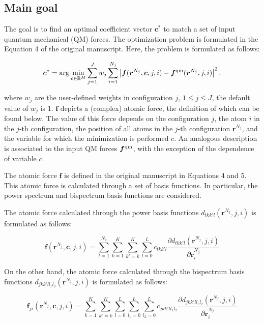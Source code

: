 \documentclass[12pt]{article}
\begin{document}
\subsection{Main goal}

The goal is to find an optimal coefficient vector $\bm c^*$ to match a set of input quantum mechanical (QM) forces. The optimization problem is formulated in the Equation 4 of the original manuscript. Here, the problem is formulated as follows:

\begin{equation}
\bm c^* = \arg \min_{\bm c \in \mathbb{R}^M } \sum_{j=1}^J w_j \sum_{i=1}^{N_j}  \left|\bm f(\bm {r}^{N_j}, \bm c, j, i) - \bm f^{\rm qm}(\bm r^{N_j}, j, i) \right|^2.
\label{eq:min1}
\end{equation}

where $w_j$ are the user-defined weights in configuration $j$, $1 \le j \le J$, the default value of $w_j$ is 1. $\bm f$  depicts a (complex) atomic force, the definition of which can be found below. The value of this force depends on the configuration $j$, the atom $i$ in the $j$-th configuration, the position of all atoms in the $j$-th configuration $\bm {r}^{N_j}$, and the variable for which the minimization is performed $c$. An analogous description is associated to the input QM forces $\bm f^{\rm qm}$, with the exception of the dependence of variable $c$.

The atomic force $\bm f$ is defined in the original manuscript in Equations 4 and 5. This atomic force is calculated through a set of basis functions. In particular, the power spectrum  and bispectrum basis functions are considered.

The atomic force calculated through the power basis functions $d_{tkk'l}(\bm r^{N_j}, j, i)$ is formulated as follows:

\begin{equation}
    \bm f(\bm {r}^{N_j}, \bm c, j, i) = 
    \sum_{t=1}^{N_z}
    \sum_{k=1}^K
    \sum_{k'=k}^{K}
    \sum_{l=0}^L
    c_{tkk'l}
    \frac{\partial d_{tkk'l}(\bm r^{N_j}, j, i)}{\partial \bm r^{N_j}_i}
    \label{eq:force}
\end{equation}


On the other hand, the atomic force calculated through the bispectrum basis functions $d_{jkk'l{l_1}{l_2}}(\bm r^{N_j}, j, i)$ is formulated as follows:

\begin{equation}
    \bm f_{ji}(\bm {r}^{N_j}, \bm c, j, i) = 
    \sum_{k=1}^K
    \sum_{k'=k}^{K}
    \sum_{l=0}^L
    \sum_{l_1=0}^L
    \sum_{l_2=0}^L
    c_{jkk'l{l_1}{l_2}}
    \frac{\partial d_{jkk'l{l_1}{l_2}}(\bm r^{N_j}, j, i)}{\partial \bm r^{N_j}_i}
    \label{eq:force}
\end{equation}
\end{document}
